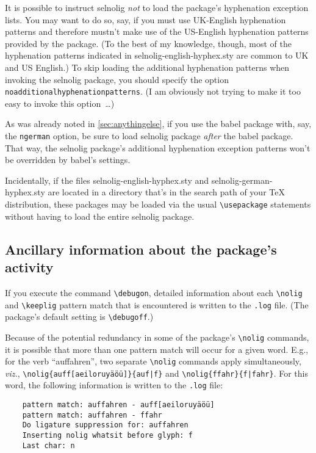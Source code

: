 \documentclass[11pt]{article}
\newcommand{\pkg}[1]{\textsf{#1}}
\newcommand{\opt}[1]{\texttt{#1}}
\newcommand{\cmmd}[1]{\texttt{\textbackslash #1}}
\begin{document}
It is possible to instruct \pkg{selnolig} \emph{not} to load the package's hyphenation exception lists. You may want to do so, say, if you must use UK-English hyphenation patterns and therefore mustn't make use of the US-English hyphenation patterns provided by the package. (To the best of my knowledge, though, most of the hyphenation patterns indicated in \pkg{selnolig-english-hyphex.sty} are common to UK and US English.) To skip loading the additional hyphenation patterns when invoking the \pkg{selnolig} package, you should specify the option \opt{noadditional\-hyphen\-a\-tion\-patterns}. (I am obviously not trying to make it too easy to invoke this option~\dots)

As was already noted in \cref{sec:anythingelse}, if you use the \pkg{babel} package with, say, the \opt{ngerman} option, be sure to load \pkg{selnolig} package \emph{after} the \pkg{babel} package. That way, the \pkg{selnolig} package's additional hyphenation exception patterns won't be overridden by \pkg{babel}'s settings.

Incidentally, if the files \pkg{selnolig-english-hyphex.sty} and \pkg{selnolig-german-hyphex.sty} are located in a directory that's in the search path of your TeX distribution, these packages may be loaded via the usual \cmmd{usepackage} statements without having to load the entire \pkg{selnolig} package.



\subsection{Ancillary information about the package's activity} \label{sec:debugon}

If you execute the command \cmmd{debugon}, detailed information about each \cmmd{nolig} and \cmmd{keeplig} pattern match that is encountered is written to the \opt{.log} file. (The package's default setting is \cmmd{debugoff}.)

Because of the potential redundancy in some of the package's \cmmd{nolig} commands, it is possible that more than one pattern match will occur for a given word. E.g., for the verb \enquote{auffahren}, two separate \cmmd{nolig} commands apply simultaneously, \emph{viz.}, \Verb+\nolig{auff[aeiloruyäöü]}{auf|f}+ and \Verb+\nolig{ffahr}{f|fahr}+. For this word, the following information is written to the \opt{.log} file:
\begin{Verbatim}
    pattern match: auffahren - auff[aeiloruyäöü]
    pattern match: auffahren - ffahr
    Do ligature suppression for: auffahren
    Inserting nolig whatsit before glyph: f
    Last char: n
\end{Verbatim}
\end{document}
